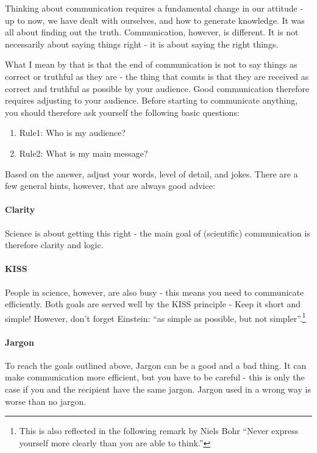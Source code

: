 \documentclass{tufte-book}
\begin{document}
Thinking about communication requires a fundamental change in our attitude - up to now, we have dealt with ourselves, and how to generate knowledge. It was all about finding out the truth. Communication, however, is different. It is not necessarily about saying things right - it is about saying the right things. 

What I mean by that is that the end of communication is not to say things as correct or truthful as they are - the thing that counts is that they are received as correct and truthful as possible by your audience. Good communication therefore requires adjusting to your audience. Before starting to communicate anything, you should therefore ask yourself the following basic questions:


\begin{enumerate}
\item Rule1: Who is my audience?
\item Rule2: What is my main message?
\end{enumerate}

Based on the answer, adjust your words, level of detail, and jokes. There are a few general hints, however, that are always good advice:



\paragraph{Clarity} Science is about getting this right - the main goal of (scientific) communication is therefore clarity and logic. 

\paragraph{KISS} People in science, however, are also busy - this means you need to communicate efficiently. Both goals are served well by the KISS principle - Keep it short and simple! However, don't forget Einstein: “as simple as possible, but not simpler”.\footnote{This is also reflected in the following remark by Niels Bohr “Never express yourself more clearly than you are able to think.”}

\paragraph{Jargon} To reach the goals outlined above, Jargon can be a good and a bad thing. It can make communication more efficient, but you have to be careful - this is only the case if you and the recipient have the same jargon. Jargon used in a wrong way is worse than no jargon.
\end{document}
